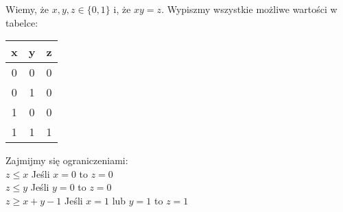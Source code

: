 \documentclass[12 pt]{article}        	%
\begin{document}
									
Wiemy, że \(x,y,z \in \{0, 1\}\) i, że \(xy = z\).
Wypiszmy wszystkie możliwe wartości w tabelce: 
\begin{center}
\begin{tabular}{ |c|c|c| } 
\hline
 x & y & z \\
 \hline
 0 & 0 & 0 \\
 \hline
 0 & 1 & 0 \\
 \hline
 1 & 0 & 0 \\
 \hline
 1 & 1 & 1 \\
 \hline
\end{tabular}
\end{center}
Zajmijmy się ograniczeniami: \\
\(z \leq x\) Jeśli \(x=0\) to \(z=0\) \\
\(z \leq y\) Jeśli \(y=0\) to \(z=0\) \\
\(z \geq x + y - 1\) Jeśli \(x = 1\) lub \(y = 1\) to \(z = 1\)
\end{document}
